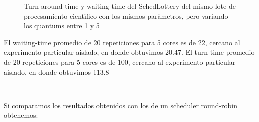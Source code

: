 \begin{figure}
\hfill
{}
\hfill
{}
\hfill
\caption{Turn around time y waiting time del SchedLottery del mismo lote de procesamiento cientìfico con los mismos paràmetros,
	pero variando los quantums entre 1 y 5}
\end{figure}

El waiting-time promedio de 20 repeticiones para 5 cores es de 22, cercano al experimento particular aislado, en donde obtuvimos 20.47.
El turn-time promedio de 20 repeticiones para 5 cores es de 100, cercano al experimento particular aislado, en donde obtuvimos 113.8

~

Si comparamos los resultados obtenidos con los de un scheduler round-robin obtenemos:

